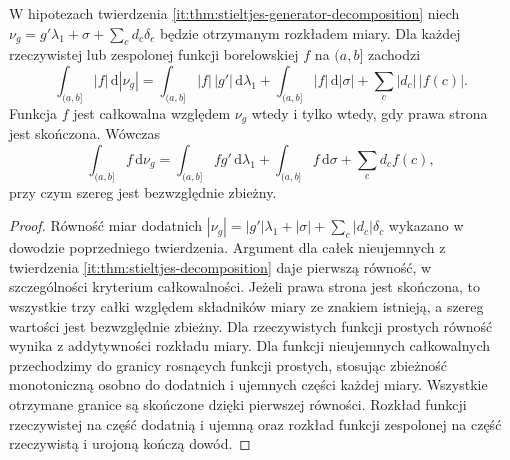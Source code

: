 \begin{wniosek}
\label{it:cor:stieltjes-signed-integrability}
W hipotezach twierdzenia \ref{it:thm:stieltjes-generator-decomposition}
niech $\nu_g=g'\lambda_1+\sigma+\sum_c d_c\delta_c$
będzie otrzymanym rozkładem miary.
Dla każdej rzeczywistej lub zespolonej funkcji borelowskiej
$f$ na $(a,b]$ zachodzi
\[
 \int_{(a,b]}|f|\,\mathrm d|\nu_g|
 =\int_{(a,b]}|f|\,|g'|\,\mathrm d\lambda_1
  +\int_{(a,b]}|f|\,\mathrm d|\sigma|
  +\sum_c|d_c|\,|f(c)|.
\]
Funkcja $f$ jest całkowalna względem $\nu_g$ wtedy i tylko
wtedy, gdy prawa strona jest skończona. Wówczas
\[
 \int_{(a,b]}f\,\mathrm d\nu_g
 =\int_{(a,b]}fg'\,\mathrm d\lambda_1
  +\int_{(a,b]}f\,\mathrm d\sigma+\sum_c d_cf(c),
\]
przy czym szereg jest bezwzględnie zbieżny.
\end{wniosek}
\begin{proof}
Równość miar dodatnich
$|\nu_g|=|g'|\lambda_1+|\sigma|+\sum_c|d_c|\delta_c$
wykazano w dowodzie poprzedniego twierdzenia.
Argument dla całek nieujemnych z twierdzenia
\ref{it:thm:stieltjes-decomposition} daje pierwszą równość,
w szczególności kryterium całkowalności. Jeżeli prawa
strona jest skończona, to wszystkie trzy całki względem
składników miary ze znakiem istnieją, a szereg wartości
jest bezwzględnie zbieżny. Dla rzeczywistych funkcji
prostych równość wynika z addytywności rozkładu miary.
Dla funkcji nieujemnych całkowalnych przechodzimy
do granicy rosnących funkcji prostych, stosując
zbieżność monotoniczną osobno do dodatnich i ujemnych
części każdej miary. Wszystkie otrzymane granice są
skończone dzięki pierwszej równości. Rozkład funkcji
rzeczywistej na część dodatnią i ujemną oraz rozkład
funkcji zespolonej na część rzeczywistą i urojoną
kończą dowód.
\end{proof}

